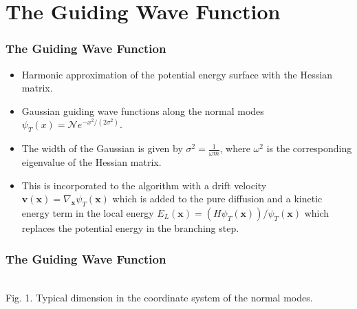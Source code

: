 \documentclass{beamer}
\begin{document}
\section{The Guiding Wave Function}
\begin{frame}
\frametitle{The Guiding Wave Function \cite{cyrus}}
\begin{itemize}
\item Harmonic approximation of the potential energy surface with the Hessian matrix.
\item Gaussian guiding wave functions along the normal modes $\psi_T(x) = \mathcal{N} e^{-x^2/(2 \sigma^2)}$.
\item The width of the Gaussian is given by $\sigma^2 = \frac{1}{\omega m}$, where $\omega^2$ is the corresponding eigenvalue of the Hessian matrix.
\item This is incorporated to the algorithm with a drift velocity $\bm{v}(\bm{x}) = \nabla_{\bm{x}} \psi_T(\bm{x})$ which is added to the pure diffusion and a kinetic energy term in the local energy $E_L(\bm{x}) = (H\psi_T(\bm{x}))/\psi_T(\bm{x})$ which replaces the potential energy in the branching step.

\end{itemize} 

\end{frame}

\begin{frame}
\frametitle{The Guiding Wave Function}
\begin{center}
\\
Fig. 1. Typical dimension in the coordinate system of the normal modes.
\end{center}

\end{frame}
\end{document}
